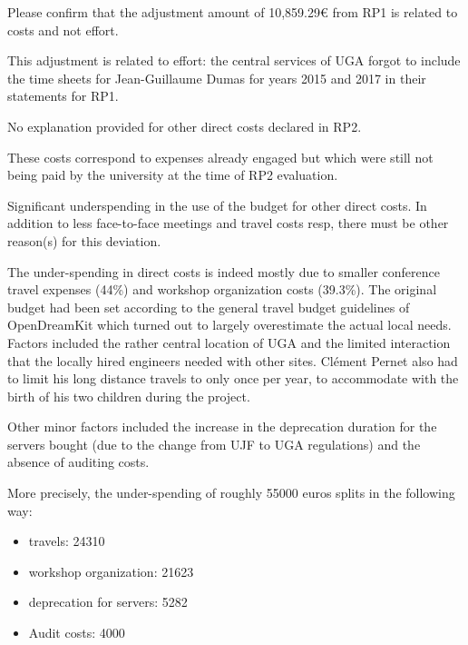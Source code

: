 \begin{EUcomment}
  Please confirm that the adjustment amount of 10,859.29€ from RP1 is
  related to costs and not effort.
\end{EUcomment}
This adjustment is related to effort: the central services of UGA
forgot to include the time sheets for Jean-Guillaume Dumas for years
2015 and 2017 in their statements for RP1.

\begin{EUcomment}
  No explanation provided for other direct costs declared in RP2.
\end{EUcomment}
These costs correspond to expenses already engaged but which were still not being paid by the university at
the time of RP2 evaluation.

\begin{EUcomment}
  Significant underspending in the use of the budget for other direct
  costs. In addition to less face-to-face meetings and travel costs
  resp, there must be other reason(s) for this deviation.
\end{EUcomment}

The under-spending in direct costs is indeed mostly due to smaller
conference travel expenses (44\%) and workshop organization costs
(39.3\%). The original budget had been set according to the general
travel budget guidelines of OpenDreamKit which turned out to largely
overestimate the actual local needs. Factors included the rather
central location of UGA and the limited interaction that the locally
hired engineers needed with other sites. Cl\'ement Pernet also had to
limit his long distance travels to only once per year, to accommodate
with the birth of his two children during the project.

Other minor factors included the increase in the deprecation duration for the
servers bought (due to the change from UJF to UGA regulations) and the absence of auditing costs.

More precisely, the under-spending of roughly 55000 euros splits in the following way:

\begin{itemize}
\item travels: 24310
\item workshop organization: 21623
\item deprecation for servers: 5282
\item Audit costs: 4000
\end{itemize}

